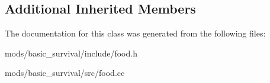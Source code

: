 \subsection*{Additional Inherited Members}


The documentation for this class was generated from the following files\+:\begin{DoxyCompactItemize}
\item 
mods/basic\+\_\+survival/include/food.\+h\item 
mods/basic\+\_\+survival/src/food.\+cc\end{DoxyCompactItemize}
